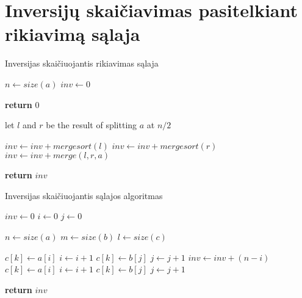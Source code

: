\documentclass{VUMIFInfBakalaurinis}
\begin{document}
\section{Inversijų skaičiavimas pasitelkiant rikiavimą sąlaja}

\begin{algorithm}[H]
  \caption{Inversijas skaičiuojantis rikiavimas sąlaja}\label{alg:merge_sort}
  \begin{algorithmic}[1]
      \State $n \gets size(a)$
      \State $inv \gets 0$
      
        \State \textbf{return} $0$ 
      \EndIf

      \State let $l$ and $r$ be the result of splitting $a$ at $n/2$

      \State $inv \gets inv + mergesort(l)$
      \State $inv \gets inv + mergesort(r)$
      \State $inv \gets inv + merge(l,r,a)$

      \State \textbf{return} $inv$ 

    \EndProcedure
  \end{algorithmic}
\end{algorithm}

\begin{algorithm}[H]
  \caption{Inversijas skaičiuojantis sąlajos algoritmas}\label{alg:merge}
  \begin{algorithmic}[1]
      \State $inv \gets 0$
      \State $i \gets 0$
      \State $j \gets 0$

      \State $n \gets size(a)$
      \State $m \gets size(b)$
      \State $l \gets size(c)$
      
              \State $c[k] \gets a[i]$
              \State $i \gets i+1$
            \Else
              \State $c[k] \gets b[j]$
              \State $j \gets j+1$
              \State $inv \gets inv + (n-i)$
            \EndIf
          \Else
            \State $c[k] \gets a[i]$
            \State $i \gets i+1$
          \EndIf
        \Else
          \State $c[k] \gets b[j]$
          \State $j \gets j+1$
        \EndIf
      \EndFor

      \State \textbf{return} $inv$
      
    \EndProcedure
  \end{algorithmic}
\end{algorithm}
\end{document}
